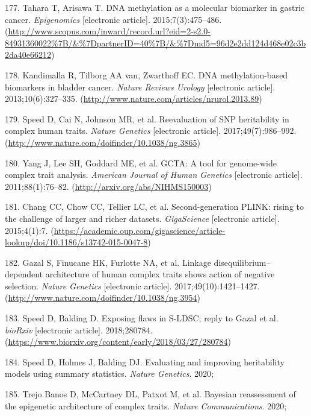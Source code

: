 \documentclass[11pt,oneside]{bristolthesis}
\newenvironment{cslreferences}%
  {}%
  {\par}
\begin{document}
\begin{cslreferences}
\leavevmode\hypertarget{ref-Tahara2015}{}%
177. Tahara T, Arisawa T. DNA methylation as a molecular biomarker in gastric cancer. \emph{Epigenomics} {[}electronic article{]}. 2015;7(3):475--486. (\url{http://www.scopus.com/inward/record.url?eid=2-s2.0-84931360022\%7B/\&\%7DpartnerID=40\%7B/\&\%7Dmd5=96d2e2dd124d468e02c3b2da40e66212})

\leavevmode\hypertarget{ref-Kandimalla2013}{}%
178. Kandimalla R, Tilborg AA van, Zwarthoff EC. DNA methylation-based biomarkers in bladder cancer. \emph{Nature Reviews Urology} {[}electronic article{]}. 2013;10(6):327--335. (\url{http://www.nature.com/articles/nrurol.2013.89})

\leavevmode\hypertarget{ref-Speed2017}{}%
179. Speed D, Cai N, Johnson MR, et al. Reevaluation of SNP heritability in complex human traits. \emph{Nature Genetics} {[}electronic article{]}. 2017;49(7):986--992. (\url{http://www.nature.com/doifinder/10.1038/ng.3865})

\leavevmode\hypertarget{ref-Yang2011}{}%
180. Yang J, Lee SH, Goddard ME, et al. GCTA: A tool for genome-wide complex trait analysis. \emph{American Journal of Human Genetics} {[}electronic article{]}. 2011;88(1):76--82. (\url{http://arxiv.org/abs/NIHMS150003})

\leavevmode\hypertarget{ref-Chang2015}{}%
181. Chang CC, Chow CC, Tellier LC, et al. Second-generation PLINK: rising to the challenge of larger and richer datasets. \emph{GigaScience} {[}electronic article{]}. 2015;4(1):7. (\url{https://academic.oup.com/gigascience/article-lookup/doi/10.1186/s13742-015-0047-8})

\leavevmode\hypertarget{ref-Gazal2017}{}%
182. Gazal S, Finucane HK, Furlotte NA, et al. Linkage disequilibrium--dependent architecture of human complex traits shows action of negative selection. \emph{Nature Genetics} {[}electronic article{]}. 2017;49(10):1421--1427. (\url{http://www.nature.com/doifinder/10.1038/ng.3954})

\leavevmode\hypertarget{ref-Speed2018}{}%
183. Speed D, Balding D. Exposing flaws in S-LDSC; reply to Gazal et al. \emph{bioRxiv} {[}electronic article{]}. 2018;280784. (\url{https://www.biorxiv.org/content/early/2018/03/27/280784})

\leavevmode\hypertarget{ref-Speed2020}{}%
184. Speed D, Holmes J, Balding DJ. Evaluating and improving heritability models using summary statistics. \emph{Nature Genetics}. 2020;

\leavevmode\hypertarget{ref-TrejoBanos2020}{}%
185. Trejo Banos D, McCartney DL, Patxot M, et al. Bayesian reassessment of the epigenetic architecture of complex traits. \emph{Nature Communications}. 2020;


\end{cslreferences}
\end{document}
